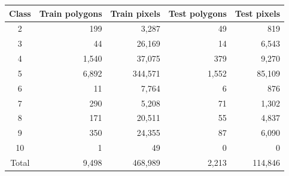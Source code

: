 \begin{tabular}{crrrr}
\toprule
Class & Train polygons & Train pixels & Test polygons & Test pixels \\
\midrule
2 & 199 & 3,287 & 49 & 819 \\
3 & 44 & 26,169 & 14 & 6,543 \\
4 & 1,540 & 37,075 & 379 & 9,270 \\
5 & 6,892 & 344,571 & 1,552 & 85,109 \\
6 & 11 & 7,764 & 6 & 876 \\
7 & 290 & 5,208 & 71 & 1,302 \\
8 & 171 & 20,511 & 55 & 4,837 \\
9 & 350 & 24,355 & 87 & 6,090 \\
10 & 1 & 49 & 0 & 0 \\
\midrule
Total & 9,498 & 468,989 & 2,213 & 114,846 \\
\bottomrule
\end{tabular}
